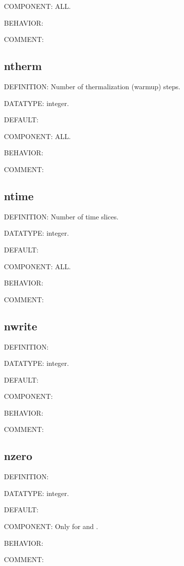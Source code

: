 {\color{brown}COMPONENT:} ALL.

{\color{purple}BEHAVIOR:}

{\color{olive}COMMENT:}

\subsection{ntherm}
{\color{red}DEFINITION:} Number of thermalization (warmup) steps.

{\color{green}DATATYPE:} integer.

{\color{blue}DEFAULT:}

{\color{brown}COMPONENT:} ALL.

{\color{purple}BEHAVIOR:}

{\color{olive}COMMENT:}

\subsection{ntime}
{\color{red}DEFINITION:} Number of time slices.

{\color{green}DATATYPE:} integer.

{\color{blue}DEFAULT:}

{\color{brown}COMPONENT:} ALL.

{\color{purple}BEHAVIOR:}

{\color{olive}COMMENT:}

\subsection{nwrite}
{\color{red}DEFINITION:}

{\color{green}DATATYPE:} integer.

{\color{blue}DEFAULT:}

{\color{brown}COMPONENT:}

{\color{purple}BEHAVIOR:}

{\color{olive}COMMENT:}

\subsection{nzero}
{\color{red}DEFINITION:}

{\color{green}DATATYPE:} integer.

{\color{blue}DEFAULT:}

{\color{brown}COMPONENT:} Only for {\begonia} and {\lavender}.

{\color{purple}BEHAVIOR:}

{\color{olive}COMMENT:}


